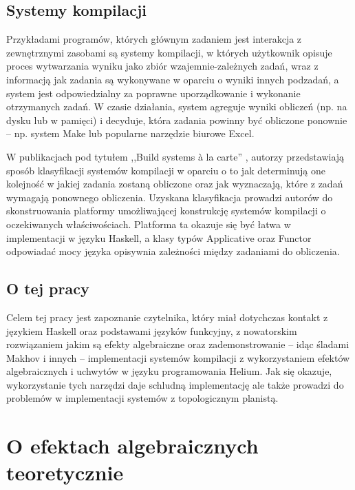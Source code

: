 \documentclass[shortabstract]{iithesis}
\begin{document}
\section{Systemy kompilacji}

Przykładami programów, których głównym zadaniem jest interakcja z zewnętrznymi zasobami są systemy kompilacji, w których użytkownik opisuje proces wytwarzania wyniku jako zbiór wzajemnie-zależnych zadań, wraz z informacją jak zadania są wykonywane w oparciu o wyniki innych podzadań, a system jest odpowiedzialny za poprawne uporządkowanie i wykonanie otrzymanych zadań. W czasie działania, system agreguje wyniki obliczeń (np. na dysku lub w pamięci) i decyduje, która zadania powinny być obliczone ponownie -- np. system Make lub popularne narzędzie biurowe Excel.

W publikacjach pod tytułem ,,Build systems {\`a} la carte'' \cite{mokhov2018build} \cite{mokhov2020build}, autorzy przedstawiają sposób klasyfikacji systemów kompilacji w oparciu o to jak determinują one kolejność w jakiej zadania zostaną obliczone oraz jak wyznaczają, które z zadań wymagają ponownego obliczenia. Uzyskana klasyfikacja prowadzi autorów do skonstruowania platformy umożliwającej konstrukcję systemów kompilacji o oczekiwanych właściwościach. Platforma ta okazuje się być łatwa w implementacji w języku Haskell, a klasy typów Applicative oraz Functor odpowiadać mocy języka opisywnia zależności między zadaniami do obliczenia.

\section{O tej pracy}

Celem tej pracy jest zapoznanie czytelnika, który miał dotychczas kontakt z językiem Haskell oraz podstawami języków funkcyjny, z nowatorskim rozwiązaniem jakim są efekty algebraiczne oraz zademonstrowanie -- idąc śladami Makhov i innych \cite{mokhov2018build} -- implementacji systemów kompilacji z wykorzystaniem efektów algebraicznych i uchwytów w języku programowania Helium. Jak się okazuje, wykorzystanie tych narzędzi daje schludną implementację ale także prowadzi do problemów w implementacji systemów z topologicznym planistą.





\chapter{O efektach algebraicznych teoretycznie}
\end{document}

